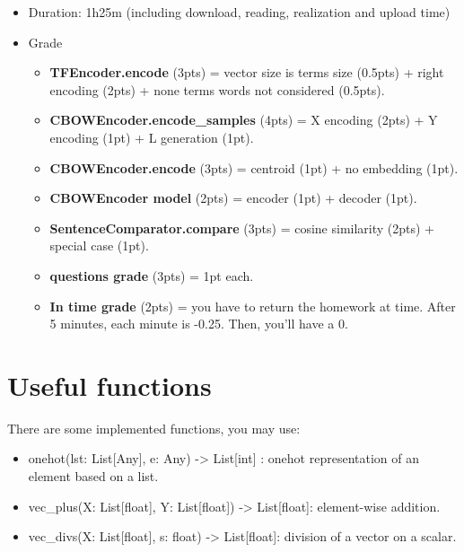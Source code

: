 \documentclass[11pt, a4paper]{article}
\begin{document}
\begin{itemize}
	\item Duration: 1h25m (including download, reading, realization and upload time)
	\item Grade
	\begin{itemize}
		\item \textbf{TFEncoder.encode} (3pts) = vector size is terms size (0.5pts) + right encoding (2pts) + none terms words not considered (0.5pts).
		\item \textbf{CBOWEncoder.encode\_samples} (4pts) = X encoding (2pts) + Y encoding (1pt) + L generation (1pt).
		\item \textbf{CBOWEncoder.encode} (3pts) = centroid (1pt) + no embedding (1pt).
		\item \textbf{CBOWEncoder model} (2pts) = encoder (1pt) + decoder (1pt).
		\item \textbf{SentenceComparator.compare} (3pts) = cosine similarity (2pts) + special case (1pt).
		\item \textbf{questions grade} (3pts) = 1pt each.
		\item \textbf{In time grade} (2pts) = you have to return the homework at time. 
		After 5 minutes, each minute is -0.25.
		Then, you'll have a 0.
	\end{itemize}
\end{itemize}

\section{Useful functions}

There are some implemented functions, you may use:
\begin{itemize}
	\item onehot(lst: List[Any], e: Any) -> List[int] : onehot representation of an element based on a list.
	\item vec\_plus(X: List[float], Y: List[float]) -> List[float]: element-wise addition.
	\item vec\_divs(X: List[float], s: float) -> List[float]: division of a vector on a scalar.
\end{itemize}
\end{document}
